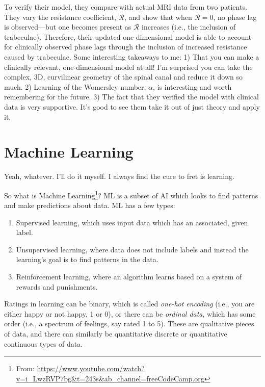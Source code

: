 To verify their model, they compare with actual MRI data from two patients. They vary the resistance coefficient, $\mathcal{R}$, and show that when $\mathcal{R} = 0$, no phase lag is observed---but one becomes present as $\mathcal{R}$ increases (i.e., the inclusion of trabeculae). Therefore, their updated one-dimensional model is able to account for clinically observed phase lags through the inclusion of increased resistance caused by trabeculae. Some interesting takeaways to me: 1) That you can make a clinically relevant, one-dimensional model at all! I'm surprised you can take the complex, 3D, curvilinear geometry of the spinal canal and reduce it down so much. 2) Learning of the Womersley number, $\alpha$, is interesting and worth remembering for the future. 3) The fact that they verified the model with clinical data is very supportive. It's good to see them take it out of just theory and apply it. 


\chapter{Machine Learning}

Yeah, whatever. I'll do it myself. I always find the cure to fret is learning.\newline

So what is Machine Learning\footnote{From: \url{https://www.youtube.com/watch?v=i_LwzRVP7bg&t=243s&ab_channel=freeCodeCamp.org}}? ML is a subset of AI which looks to find patterns and make predictions about data. ML has a few types: 

\begin{enumerate}
    \item Supervised learning, which uses input data which has an associated, given label. 
    \item Unsupervised learning, where data does not include labels and instead the learning's goal is to find patterns in the data. 
    \item Reinforcement learning, where an algorithm learns based on a system of rewards and punishments. 
\end{enumerate}

Ratings in learning can be binary, which is called \textit{one-hot encoding} (i.e., you are either happy or not happy, 1 or 0), or there can be \textit{ordinal data}, which has some order (i.e., a spectrum of feelings, say rated 1 to 5). These are qualitative pieces of data, and there can similarly be quantitative discrete or quantitative continuous types of data.\newline

